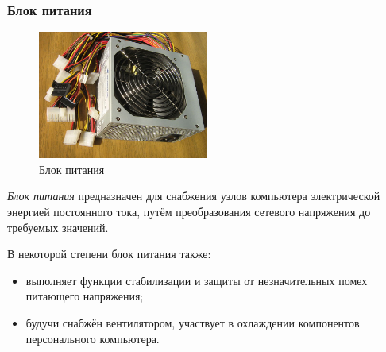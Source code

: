 \subsubsection{Блок питания}\label{base:introduction:components:psu}
\begin{figure}[hb]
 \centering
 \includegraphics[width=0.5\textwidth]{base/Introduction/Power_supply_unit.jpg}
 \caption{Блок питания}
 \label{base:introduction:components:psupic}
\end{figure}
\emph{Блок питания} предназначен для снабжения узлов компьютера электрической энергией постоянного тока, путём преобразования сетевого напряжения до требуемых значений.

В некоторой степени блок питания также:
\begin{itemize}
 \item выполняет функции стабилизации и защиты от незначительных помех питающего напряжения;
 \item будучи снабжён вентилятором, участвует в охлаждении компонентов персонального компьютера.
\end{itemize}

